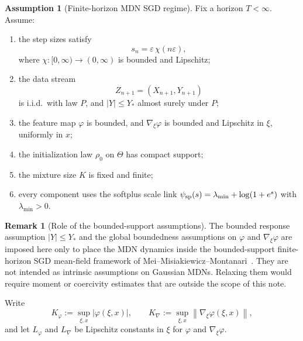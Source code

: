 \documentclass[11pt]{article}
\theoremstyle{definition}
\newtheorem{assumption}[theorem]{Assumption}
\newtheorem{remark}[theorem]{Remark}
\newcommand{\norm}[1]{\left\lVert #1 \right\rVert}
\begin{document}
\begin{assumption}[Finite-horizon MDN SGD regime]
\label{ass:mdn-sgd}
Fix a horizon $T<\infty$. Assume:
\begin{enumerate}[label=(M\arabic*)]
  \item the step sizes satisfy
  \[
    s_n=\varepsilon\,\chi(n\varepsilon),
  \]
  where $\chi:[0,\infty)\to(0,\infty)$ is bounded and Lipschitz;
  \item the data stream
  \[
    Z_{n+1}=(X_{n+1},Y_{n+1})
  \]
  is i.i.d.\ with law $P$, and $|Y|\le Y_\ast$ almost surely under $P$;
  \item the feature map $\varphi$ is bounded, and $\nabla_\xi\varphi$ is bounded
  and Lipschitz in $\xi$, uniformly in $x$;
  \item the initialization law $\rho_0$ on $\Theta$ has compact support;
  \item the mixture size $K$ is fixed and finite;
  \item every component uses the softplus scale link
  $\psi_{\rm sp}(s)=\lambda_{\min}+\log(1+e^s)$ with $\lambda_{\min}>0$.
\end{enumerate}
\end{assumption}

\begin{remark}[Role of the bounded-support assumptions]
The bounded response assumption $|Y|\le Y_\ast$ and the global boundedness
assumptions on $\varphi$ and $\nabla_\xi\varphi$ are imposed here only to place
the MDN dynamics inside the bounded-support finite-horizon SGD mean-field
framework of Mei--Misiakiewicz--Montanari~\cite{MeiMisiakiewiczMontanari2019}.
They are not intended as intrinsic assumptions on Gaussian MDNs. Relaxing them
would require moment or coercivity estimates that are outside the scope of this
note.
\end{remark}

Write
\[
  K_\varphi:=\sup_{\xi,x} |\varphi(\xi,x)|,
  \qquad
  K_\nabla:=\sup_{\xi,x}\norm{\nabla_\xi\varphi(\xi,x)},
\]
and let $L_\varphi$ and $L_\nabla$ be Lipschitz constants in $\xi$ for
$\varphi$ and $\nabla_\xi\varphi$.
\end{document}
